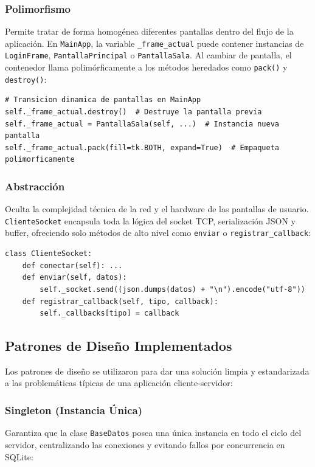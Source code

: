 \documentclass[12pt,a4paper]{article}
\begin{document}
\subsubsection{Polimorfismo}
Permite tratar de forma homog\'enea diferentes pantallas dentro del flujo de la aplicaci\'on. En \texttt{MainApp}, la variable \texttt{\_frame\_actual} puede contener instancias de \texttt{LoginFrame}, \texttt{PantallaPrincipal} o \texttt{PantallaSala}. Al cambiar de pantalla, el contenedor llama polim\'orficamente a los m\'etodos heredados como \texttt{pack()} y \texttt{destroy()}:

\begin{lstlisting}
# Transicion dinamica de pantallas en MainApp
self._frame_actual.destroy()  # Destruye la pantalla previa
self._frame_actual = PantallaSala(self, ...)  # Instancia nueva pantalla
self._frame_actual.pack(fill=tk.BOTH, expand=True)  # Empaqueta polimorficamente
\end{lstlisting}

\subsubsection{Abstracci\'on}
Oculta la complejidad t\'ecnica de la red y el hardware de las pantallas de usuario. \texttt{ClienteSocket} encapsula toda la l\'ogica del socket TCP, serializaci\'on JSON y buffer, ofreciendo solo m\'etodos de alto nivel como \texttt{enviar} o \texttt{registrar\_callback}:

\begin{lstlisting}
class ClienteSocket:
    def conectar(self): ...
    def enviar(self, datos):
        self._socket.send((json.dumps(datos) + "\n").encode("utf-8"))
    def registrar_callback(self, tipo, callback):
        self._callbacks[tipo] = callback
\end{lstlisting}

\subsection{Patrones de Dise\~no Implementados}

Los patrones de dise\~no se utilizaron para dar una soluci\'on limpia y estandarizada a las problem\'aticas t\'ipicas de una aplicaci\'on cliente-servidor:

\subsubsection{Singleton (Instancia \'{U}nica)}
Garantiza que la clase \texttt{BaseDatos} posea una \'unica instancia en todo el ciclo del servidor, centralizando las conexiones y evitando fallos por concurrencia en SQLite:
\end{document}
